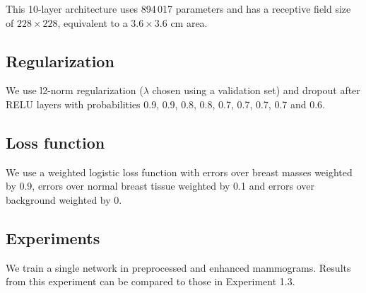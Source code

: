 This 10-layer architecture uses 894\,017 parameters and has a receptive field size of $228 \times 228$, equivalent to a $3.6 \times 3.6$ cm area.
	
\subsection{Regularization}
We use l2-norm regularization ($\lambda$ chosen using a validation set) and dropout after RELU layers with probabilities 0.9, 0.9, 0.8, 0.8, 0.7, 0.7, 0.7, 0.7 and 0.6.

\subsection{Loss function}
We use a weighted logistic loss function with errors over breast masses weighted by 0.9, errors over normal breast tissue weighted by 0.1 and errors over background weighted by 0. 

\subsection{Experiments}
We train a single network in preprocessed and enhanced mammograms. Results from this experiment can be compared to those in Experiment 1.3.
